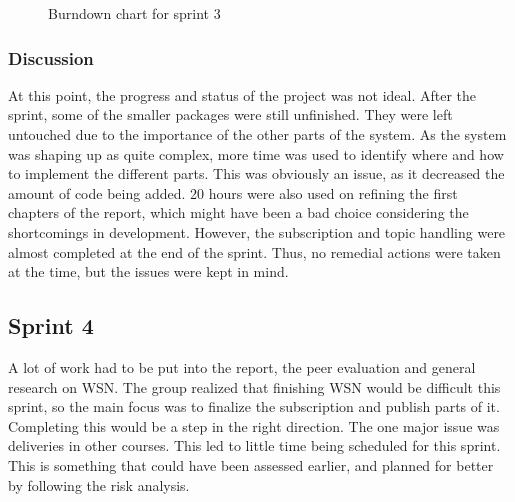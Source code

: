 \begin{center}
  \begin{figure}[ht!]
    \caption{Burndown chart for sprint 3}
    \label{fig:sprint 3, burndown}
  \end{figure}
\end{center}

\subsubsection{Discussion}
\label{subsec:project_lifecycle-development-sprint_3-discussion}

At this point, the progress and status of the project was not ideal. After the sprint, some of the smaller packages were still unfinished. They were left untouched due to the importance of the other parts of the system. As the system was shaping up as quite complex, more time was used to identify where and how to implement the different parts. This was obviously an issue, as it decreased the amount of code being added. 20 hours were also used on refining the first chapters of the report, which might have been a bad choice considering the shortcomings in development. However, the subscription and topic handling were almost completed at the end of the sprint. Thus, no remedial actions were taken at the time, but the issues were kept in mind. 


\subsection{Sprint 4}
\label{subsec:project_lifecycle-development-sprint_4}

A lot of work had to be put into the report, the peer evaluation and general research on WSN. The group realized that finishing WSN would be difficult this sprint, so the main focus was to finalize the subscription and publish parts of it. Completing this would be a step in the right direction. The one major issue was deliveries in other courses. This led to little time being scheduled for this sprint. This is something that could have been assessed earlier, and planned for better by following the risk analysis.

